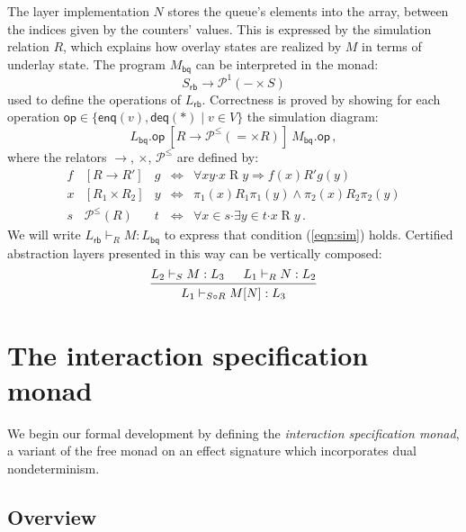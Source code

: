 \documentclass[sigplan,10pt,review,anonymous]{acmart}
\newcommand{\kw}[1]{\ensuremath{ \mathsf{#1} }}
\newcommand{\bdot}{\boldsymbol{\cdot}}
\begin{document}
The layer implementation $N$
stores the queue's elements into the array,
between the indices given by the counters' values.
This is expressed by the simulation relation $R$,
which explains how overlay states are realized by $M$
in terms of underlay state.
The program $M_\kw{bq}$ can be interpreted in the monad:
\[
    S_\kw{rb} \rightarrow \mathcal{P}^1(- \times S)
\]
used to define the operations of $L_\kw{rb}$.
Correctness is proved by showing
for each operation
$\kw{op} \in \{ \kw{enq}(v), \kw{deq}(*) \mid v \in V \}$
the simulation diagram:
\begin{equation}
  \label{eqn:sim}
  L_\kw{bq}.\kw{op}
  \: \mathrel{[R \rightarrow \mathcal{P}^\le({=} \times R)]} \:
  M_\kw{bq}.\kw{op} \,,
\end{equation}
where the relators $\rightarrow$, $\times$, $\mathcal{P}^\le$
are defined by:
\[
  \begin{array}{rclcl}
    f & [R \rightarrow R'] & g & \Leftrightarrow &
    \forall x y \bdot x \mathrel{R} y \Rightarrow
    f(x) \mathrel{R'} g(y) \\
  x & [R_1 \times R_2] & y & \Leftrightarrow &
    \pi_1(x) \mathrel{R_1} \pi_1(y) \wedge
    \pi_2(x) \mathrel{R_2} \pi_2(y) \\
  s & \mathcal{P}^\le(R) & t & \Leftrightarrow &
    \forall x \in s \bdot \exists y \in t \bdot x \mathrel{R} y \,.
  \end{array}
\]
We will write $L_\kw{rb} \vdash_R M : L_\kw{bq}$
to express that condition (\ref{eqn:sim}) holds.
Certified abstraction layers presented in this way
can be vertically composed:
\[
  \begin{prooftree}
    \hypo{L_2 \vdash_S M : L_3}
    \hypo{L_1 \vdash_R N : L_2}
    \infer2{L_1 \vdash_{S \circ R} M[N] : L_3}
  \end{prooftree}
\]



\section{The interaction specification monad} \label{sec:intspec} %

We begin our formal development
by defining the \emph{interaction specification monad},
a variant of the free monad on an effect signature which
incorporates dual nondeterminism.

\subsection{Overview} %
\end{document}
